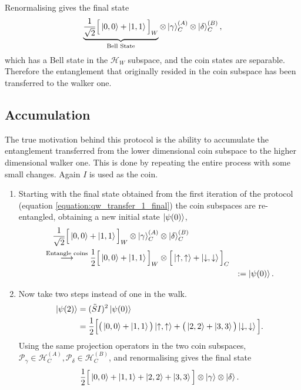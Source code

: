 Renormalising gives the final state
\begin{equation}
    \label{equation:qw_transfer_1_final}
    \underbrace{\frac{1}{\sqrt{2}}\Big [\ket{0, 0} + \ket{1, 1}\Big ]_W}_{\text{Bell State}}\otimes \ket{\gamma}^{(A)}_C \otimes \ket{\delta}^{(B)}_C,
\end{equation}
which has a Bell state in the $\mathcal{H}_W$ subspace, and the coin states are separable.
Therefore the entanglement that originally resided in the coin subspace has been transferred to the walker one.

\subsection{Accumulation}
\label{subsection:qw_accumulation}
The true motivation behind this protocol is the ability to accumulate the entanglement transferred from the lower dimensional coin subspace to the higher dimensional walker one.
This is done by repeating the entire process with some small changes.
Again $I$ is used as the coin.
\begin{enumerate}

    \item Starting with the final state obtained from the first iteration of the protocol (equation \ref{equation:qw_transfer_1_final}) the coin subspaces are re-entangled, obtaining a new initial state $\ket{\psi(0)}$,
    \begin{alignat}{3}
        \frac{1}{\sqrt{2}}
        \Big [\ket{0, 0} + \ket{1, 1}\Big ]_W\otimes \ket{\gamma}^{(A)}_C &\otimes \ket{\delta}^{(B)}_C\\
        \overset{\text{Entangle coins}}{\longrightarrow}
        \frac{1}{2}\Big [\ket{0, 0} + \ket{1, 1}\Big ]_W &\otimes
        \Big [\ket{\uparrow, \uparrow} + \ket{\downarrow, \downarrow}\Big ]_C& \\
        & &:=\ket{\psi(0)}.
    \end{alignat}
    \item Now take two steps instead of one in the walk.
    \begin{align}
        \ket{\psi(2)} &= (\tilde{S}I)^2\ket{\psi(0)}\\
        &= \frac{1}{2}\Big[\big (\ket{0,0}+\ket{1,1}\big )\ket{\uparrow,\uparrow} + \big (\ket{2,2} + \ket{3,3}\big )\ket{\downarrow,\downarrow}\Big ].
    \end{align}
     Using the same projection operators in the two coin subspaces, $\mathcal{P}_\gamma \in \mathcal{H}^{(A)}_C,  \mathcal{P}_\delta \in \mathcal{H}^{(B)}_C$, and renormalising gives the final state
    \begin{equation}
        \frac{1}{2}\Big[\ket{0,0} + \ket{1,1} + \ket{2,2} + \ket{3,3}\Big ] \otimes \ket{\gamma}\otimes\ket{\delta}.
    \end{equation}
\end{enumerate}

